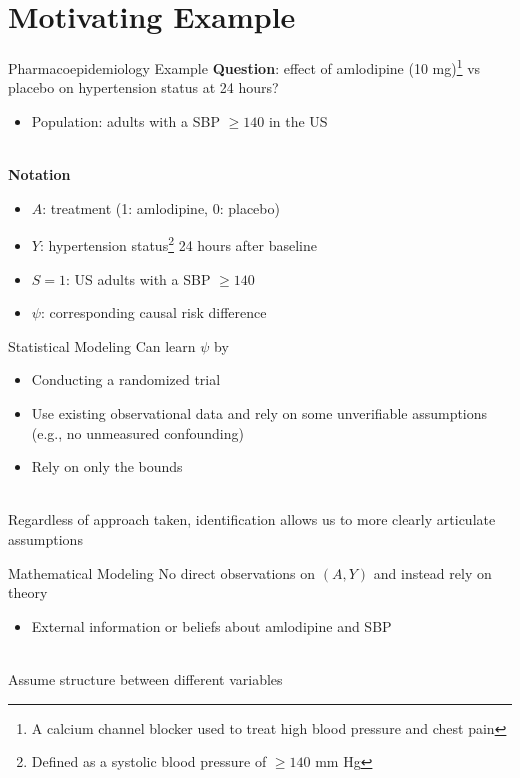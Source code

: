 \documentclass[aspectratio=169]{beamer}
\begin{document}
\section{Motivating Example}

\begin{frame}{Pharmacoepidemiology Example}
	\textbf{Question}: effect of amlodipine (10 mg)\footnote[frame]{A calcium channel blocker used to treat high blood pressure and chest pain} vs placebo on hypertension status at 24 hours?
	\begin{itemize}
		\item Population: adults with a SBP $\ge 140$ in the US
	\end{itemize}
	~\\
	\textbf{Notation}
	\begin{itemize}
		\item $A$: treatment (1: amlodipine, 0: placebo)
		\item $Y$: hypertension status\footnote[frame]{Defined as a systolic blood pressure of $\ge 140$ mm Hg} 24 hours after baseline
		\item $S=1$: US adults with a SBP $\ge 140$
		\item $\psi$: corresponding causal risk difference
	\end{itemize}
\end{frame}

\begin{frame}{Statistical Modeling}
	Can learn $\psi$ by
	\begin{itemize}
		\item Conducting a randomized trial
		\item Use existing observational data and rely on some unverifiable assumptions (e.g., no unmeasured confounding)
		\item Rely on only the bounds
	\end{itemize}
	~\\
	Regardless of approach taken, identification allows us to more clearly articulate assumptions
\end{frame}

\begin{frame}{Mathematical Modeling}
	No direct observations on $(A,Y)$ and instead rely on theory
	\begin{itemize}
		\item External information or beliefs about amlodipine and SBP
	\end{itemize}
	~\\
	Assume structure between different variables
	\begin{center}
	\end{center}
\end{frame}
\end{document}
